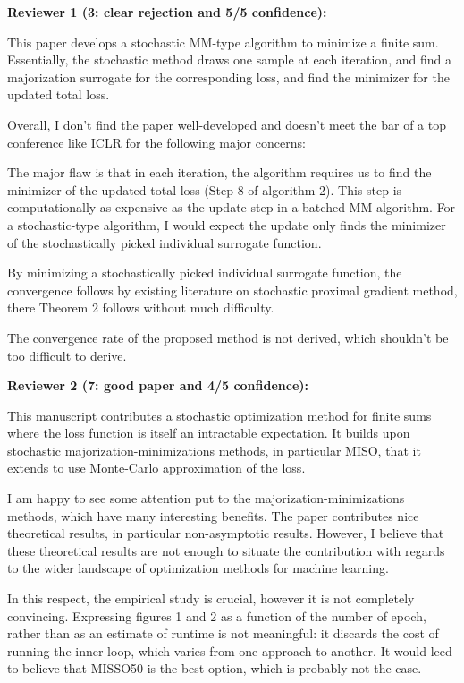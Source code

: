 \documentclass{article} %
\begin{document}
\onecolumn


\textbf{Reviewer 1 (3: clear rejection and 5/5 confidence):}

This paper develops a stochastic MM-type algorithm to minimize a finite sum. Essentially, the stochastic method draws one sample at each iteration, and find a majorization surrogate for the corresponding loss, and find the minimizer for the updated total loss.

Overall, I don't find the paper well-developed and doesn't meet the bar of a top conference like ICLR for the following major concerns:

The major flaw is that in each iteration, the algorithm requires us to find the minimizer of the updated total loss (Step 8 of algorithm 2). This step is computationally as expensive as the update step in a batched MM algorithm. For a stochastic-type algorithm, I would expect the update only finds the minimizer of the stochastically picked individual surrogate function.

By minimizing a stochastically picked individual surrogate function, the convergence follows by existing literature on stochastic proximal gradient method, there Theorem 2 follows without much difficulty.

The convergence rate of the proposed method is not derived, which shouldn't be too difficult to derive.



\textbf{Reviewer 2 (7: good paper and 4/5 confidence):}

This manuscript contributes a stochastic optimization method for finite sums where the loss function is itself an intractable expectation. It builds upon stochastic majorization-minimizations methods, in particular MISO, that it extends to use Monte-Carlo approximation of the loss.

I am happy to see some attention put to the majorization-minimizations methods, which have many interesting benefits. The paper contributes nice theoretical results, in particular non-asymptotic results. However, I believe that these theoretical results are not enough to situate the contribution with regards to the wider landscape of optimization methods for machine learning.

In this respect, the empirical study is crucial, however it is not completely convincing. Expressing figures 1 and 2 as a function of the number of epoch, rather than as an estimate of runtime is not meaningful: it discards the cost of running the inner loop, which varies from one approach to another. It would leed to believe that MISSO50 is the best option, which is probably not the case.
\end{document}

